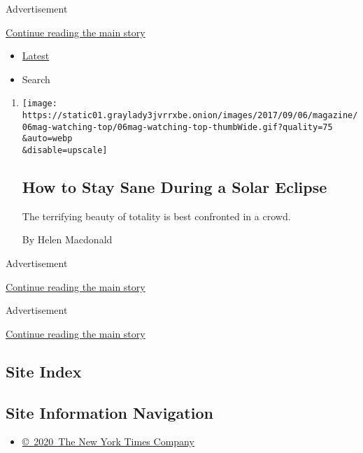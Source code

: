 Advertisement

\protect\hyperlink{after-mid1}{Continue reading the main story}

\begin{itemize}
\tightlist
\item
  \protect\hyperlink{stream-panel}{Latest}
\item
  Search
\end{itemize}

\begin{enumerate}
\def\labelenumi{\arabic{enumi}.}
\item
  \href{/2017/08/18/magazine/how-to-stay-sane-during-a-solar-eclipse.html}{}

  \texttt{[image: https://static01.graylady3jvrrxbe.onion/images/2017/09/06/magazine/06mag-watching-top/06mag-watching-top-thumbWide.gif?quality=75\\\&auto=webp\\\&disable=upscale]}

  \hypertarget{how-to-stay-sane-during-a-solar-eclipse}{%
  \subsection{How to Stay Sane During a Solar
  Eclipse}\label{how-to-stay-sane-during-a-solar-eclipse}}

  The terrifying beauty of totality is best confronted in a crowd.

  By Helen Macdonald
\end{enumerate}

Advertisement

\protect\hyperlink{after-mid2}{Continue reading the main story}

Advertisement

\protect\hyperlink{after-mktg}{Continue reading the main story}

\hypertarget{site-index}{%
\subsection{Site Index}\label{site-index}}

\hypertarget{site-information-navigation}{%
\subsection{Site Information
Navigation}\label{site-information-navigation}}

\begin{itemize}
\tightlist
\item
  \href{https://help.nytimes3xbfgragh.onion/hc/en-us/articles/115014792127-Copyright-notice}{©~2020~The
  New York Times Company}
\end{itemize}

